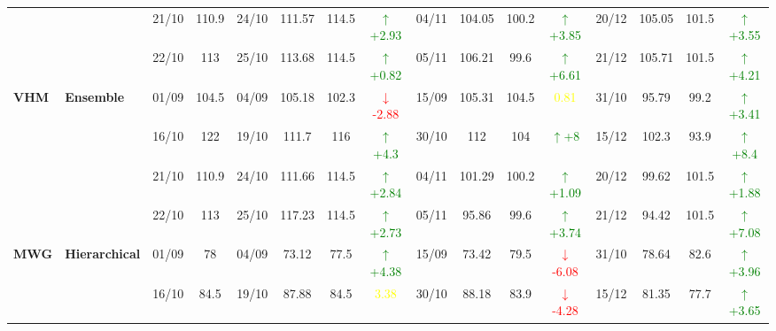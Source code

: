 \documentclass{ieeeaccess}
\begin{document}
{\begin{longtable}{llcc|cccc|cccc|cccc}
&
& 21/10 & 110.9 & 24/10 & 111.57 & 114.5 & \textcolor{green}{\(\uparrow\)+2.93} & 04/11 & 104.05 & 100.2 & \textcolor{green}{\(\uparrow\)+3.85} & 20/12 & 105.05 & 101.5 & \textcolor{green}{\(\uparrow\)+3.55} \\

&
& 22/10 & 113 & 25/10 & 113.68 & 114.5 & \textcolor{green}{\(\uparrow\)+0.82} & 05/11 & 106.21 & 99.6 & \textcolor{green}{\(\uparrow\)+6.61} & 21/12 & 105.71 & 101.5 & \textcolor{green}{\(\uparrow\)+4.21} \\
\midrule


\multirow{4}{*}{\textbf{VHM}} 
& \textbf{Ensemble}
& 01/09 & 104.5 & 04/09 & 105.18 & 102.3 & \textcolor{red}{\(\downarrow\)-2.88} & 15/09 & 105.31 & 104.5 & \textcolor{yellow}{0.81} & 31/10 & 95.79 & 99.2 & \textcolor{green}{\(\uparrow\)+3.41} \\

&
& 16/10 & 122 & 19/10 & 111.7 & 116 & \textcolor{green}{\(\uparrow\)+4.3} & 30/10 & 112 & 104 & \textcolor{green}{\(\uparrow\)+8} & 15/12 & 102.3 & 93.9 & \textcolor{green}{\(\uparrow\)+8.4} \\

&
& 21/10 & 110.9 & 24/10 & 111.66 & 114.5 & \textcolor{green}{\(\uparrow\)+2.84} & 04/11 & 101.29 & 100.2 & \textcolor{green}{\(\uparrow\)+1.09} & 20/12 & 99.62 & 101.5 & \textcolor{green}{\(\uparrow\)+1.88} \\

&
& 22/10 & 113 & 25/10 & 117.23 & 114.5 & \textcolor{green}{\(\uparrow\)+2.73} & 05/11 & 95.86 & 99.6 & \textcolor{green}{\(\uparrow\)+3.74} & 21/12 & 94.42 & 101.5 & \textcolor{green}{\(\uparrow\)+7.08} \\
\midrule




\multirow{4}{*}{\textbf{MWG}} 
& \textbf{Hierarchical}
& 01/09 & 78 & 04/09 & 73.12 & 77.5 & \textcolor{green}{\(\uparrow\)+4.38} & 15/09 & 73.42 & 79.5 & \textcolor{red}{\(\downarrow\)-6.08} & 31/10 & 78.64 & 82.6 & \textcolor{green}{\(\uparrow\)+3.96} \\

&
& 16/10 & 84.5 & 19/10 & 87.88 & 84.5 & \textcolor{yellow}{3.38} & 30/10 & 88.18 & 83.9 & \textcolor{red}{\(\downarrow\)-4.28} & 15/12 & 81.35 & 77.7 & \textcolor{green}{\(\uparrow\)+3.65} \\


\end{longtable}}
\end{document}
